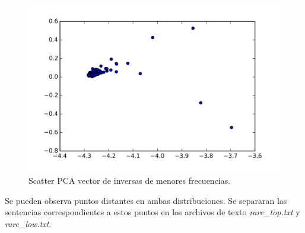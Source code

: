 \documentclass[11pt,spanish]{article}
\begin{document}
\begin{figure}[htbp]
	\centering
	\includegraphics[width=.8\textwidth]{../pca_low_freq}
	\caption{Scatter PCA vector de inversas de menores frecuencias.}
	\label{pca_low}
\end{figure}

Se pueden observa puntos distantes en ambas distribuciones. Se separaran las sentencias correspondientes a estos puntos en los archivos de texto \textit{rare\_top.txt} y \textit{rare\_low.txt}.
\end{document}
